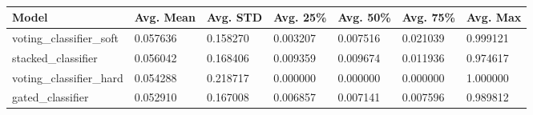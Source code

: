 \documentclass[epsfig,a4paper,11pt,titlepage,twoside,openany]{book}
\begin{document}
\begin{table}[H]
\centering
\begin{tabular}{|l|l|l|l|l|l|l|}
\hline
Model                    & Avg. Mean & Avg. STD & Avg. 25\% & Avg. 50\% & Avg. 75\% & Avg. Max \\ \hline
voting\_classifier\_soft & 0.057636     & 0.158270    & 0.003207     & 0.007516     & 0.021039     & 0.999121    \\
stacked\_classifier      & 0.056042     & 0.168406    & 0.009359     & 0.009674     & 0.011936     & 0.974617    \\
voting\_classifier\_hard & 0.054288     & 0.218717    & 0.000000     & 0.000000     & 0.000000     & 1.000000    \\
gated\_classifier        & 0.052910     & 0.167008    & 0.006857     & 0.007141     & 0.007596     & 0.989812    \\ \hline
\end{tabular}
\caption{}
\label{tab:apx-ensemble-classification-summary}
\end{table}

\end{document}
